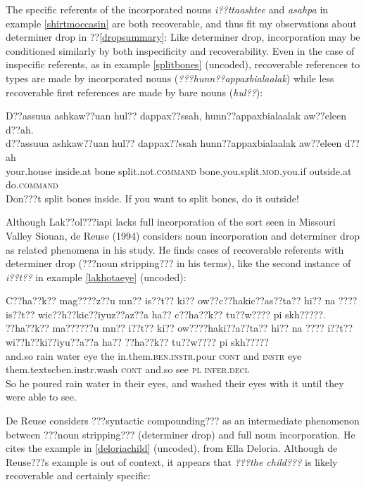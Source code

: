 \documentclass[output=paper]{LSP/langsci}
\begin{document}
	The specific referents of the incorporated nouns \emph{i??ttaashtee} and \emph{asahpa} in example \ref{shirtmoccasin} are both recoverable, and thus fit my observations about determiner drop in ??\ref{dropsummary}: Like determiner drop, incorporation may be conditioned similarly by both inspecificity and recoverability. Even in the case of inspecific referents, as in example \ref{splitbones} (uncoded), recoverable references to types are made by incorporated nouns (\emph{???hunn??appaxbialaalak}) while less recoverable first references are made by bare nouns (\emph{hul??}):
	 
\ea\label{splitbones}
 	D??assuua ashkaw??uan hul?? dappax??ssah, hunn??appaxbialaalak aw??eleen d??ah.\footnotemark\\
\gll	d??assuua		ashkaw??uan		hul??		dappax??ssah				hunn??appaxbialaalak			aw??eleen		d??ah\\
	your.house		inside.at		bone		split.not.\textsc{command}	bone.you.split.\textsc{mod}.you.if	outside.at		do.\textsc{command}\\
\glt	Don???t split bones inside. If you want to split bones, do it outside! 
\z

	Although Lak??ol???iapi lacks full incorporation of the sort seen in Missouri Valley Siouan, de Reuse (1994) considers noun incorporation and determiner drop as related phenomena in his study. He finds cases of recoverable referents with determiner drop (???noun stripping??? in his terms), like the second instance of \emph{i??t??} in example \ref{lakhotaeye} (uncoded):
	
\ea\label{lakhotaeye}
 	C??ha??k?? mag????z??u mn?? is??t?? ki?? ow??c??hakic??as??ta?? hi?? na ???? is??t?? wic??h??kic??iyuz??az??a ha?? c??ha??k?? tu??w???? pi skh?????.\footnotemark\\
\gll	??ha??k??	ma??????u	mn??	i??t??	ki??	ow????haki??a??ta??			hi??			na	????			i??t??		wi??h??ki??iyu??a??a			ha??			??ha??k??		tu??w????	pi		skh?????\\
	and.so	rain		water	eye	the	in.them.\textsc{ben.instr}.pour	\textsc{cont}	and	\textsc{instr}	eye		them.textsc{ben.instr}.wash	\textsc{cont}	and.so	see		\textsc{pl}	\textsc{infer.decl}\\
\glt	So he poured rain water in their eyes, and washed their eyes with it until they were able to see.
\z

De Reuse considers ???syntactic compounding??? as an intermediate phenomenon between ???noun stripping??? (determiner drop) and full noun incorporation. He cites the example in \ref{deloriachild} (uncoded), from Ella Deloria. Although de Reuse???s example is out of context, it appears that \emph{???the child???} is likely recoverable and certainly specific:
\end{document}
